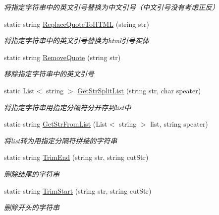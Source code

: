 \begin{DoxyCompactItemize}
\begin{DoxyCompactList}\small\item\em 将指定字符串中的英文引号替换为中文引号（中文引号没有考虑正反） \end{DoxyCompactList}\item 
static string \hyperlink{class_x_c_l_net_tools_1_1_string_hander_1_1_common_adecc464f722d6bc0e3ab9ba42277d730}{Replace\-Quote\-To\-H\-T\-M\-L} (string str)
\begin{DoxyCompactList}\small\item\em 将指定字符串中的英文引号替换为html引号实体 \end{DoxyCompactList}\item 
static string \hyperlink{class_x_c_l_net_tools_1_1_string_hander_1_1_common_a7ac48e68f1f3943c8e8425df41aa52ca}{Remove\-Quote} (string str)
\begin{DoxyCompactList}\small\item\em 移除指定字符串中的英文引号 \end{DoxyCompactList}\item 
static List$<$ string $>$ \hyperlink{class_x_c_l_net_tools_1_1_string_hander_1_1_common_a07285808438cbc513c6f511bfad2dc53}{Get\-Str\-Split\-List} (string str, char speater)
\begin{DoxyCompactList}\small\item\em 将指定字符串用指定分隔符分开存到list中 \end{DoxyCompactList}\item 
static string \hyperlink{class_x_c_l_net_tools_1_1_string_hander_1_1_common_ade13b6d1f3041a6e193a7fb37442af97}{Get\-Str\-From\-List} (List$<$ string $>$ list, string speater)
\begin{DoxyCompactList}\small\item\em 将list转为用指定分隔符拼接的字符串 \end{DoxyCompactList}\item 
static string \hyperlink{class_x_c_l_net_tools_1_1_string_hander_1_1_common_a3ed633ff7c9b12a2d63ebe9eb8fd7dd2}{Trim\-End} (string str, string cut\-Str)
\begin{DoxyCompactList}\small\item\em 删除结尾的字符串 \end{DoxyCompactList}\item 
static string \hyperlink{class_x_c_l_net_tools_1_1_string_hander_1_1_common_afcc9efd028a6a7937e8f75307e78b54c}{Trim\-Start} (string str, string cut\-Str)
\begin{DoxyCompactList}\small\item\em 删除开头的字符串 \end{DoxyCompactList}\item 

\end{DoxyCompactItemize}
